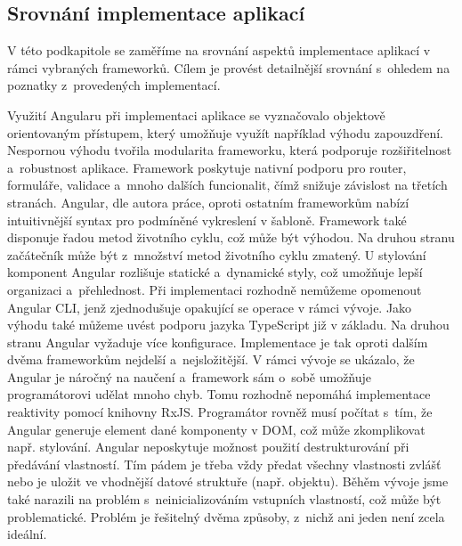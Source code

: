 



\subsection{Srovnání implementace aplikací}

V této podkapitole se zaměříme na srovnání aspektů implementace aplikací v rámci vybraných frameworků. 
Cílem je provést detailnější srovnání s~ohledem na poznatky z~provedených implementací. 

Využití Angularu při implementaci aplikace se vyznačovalo objektově orientovaným přístupem, který umožňuje využít například výhodu zapouzdření. 
Nespornou výhodu tvořila modularita frameworku, která podporuje rozšiřitelnost a~robustnost aplikace. 
Framework poskytuje nativní podporu pro router, formuláře, validace a~mnoho dalších funcionalit, čímž snižuje závislost na třetích stranách. 
Angular, dle autora práce, oproti ostatním frameworkům nabízí intuitivnější syntax pro podmíněné vykreslení v šabloně. 
Framework také disponuje řadou metod životního cyklu, což může být výhodou. Na druhou stranu začátečník může být z~množství metod životního cyklu zmatený. 
U stylování komponent Angular rozlišuje statické a~dynamické styly, což umožňuje lepší organizaci a~přehlednost. 
Při implementaci rozhodně nemůžeme opomenout Angular CLI, jenž zjednodušuje opakující se operace v rámci vývoje. 
Jako výhodu také můžeme uvést podporu jazyka TypeScript již v základu. 
Na druhou stranu Angular vyžaduje více konfigurace. Implementace je tak oproti dalším dvěma frameworkům nejdelší a~nejsložitější. 
V rámci vývoje se ukázalo, že Angular je náročný na naučení a~framework sám o~sobě umožňuje programátorovi udělat mnoho chyb. 
Tomu rozhodně nepomáhá implementace reaktivity pomocí knihovny RxJS. 
Programátor rovněž musí počítat s~tím, že Angular generuje element dané komponenty v DOM, což může zkomplikovat např. stylování. 
Angular neposkytuje možnost použití destrukturování při předávání vlastností. 
Tím pádem je třeba vždy předat všechny vlastnosti zvlášť nebo je uložit ve vhodnější datové struktuře (např. objektu).
Běhěm vývoje jsme také narazili na problém s~neinicializováním vstupních vlastností, což může být problematické. 
Problém je řešitelný dvěma způsoby, z~nichž ani jeden není zcela ideální.


